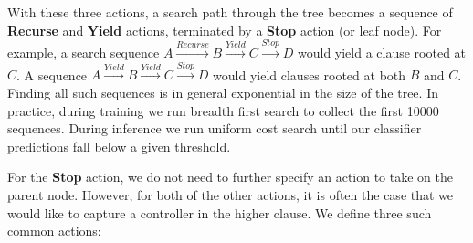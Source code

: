 
With these three actions, a search path through the tree becomes a sequence
  of \textbf{Recurse} and \textbf{Yield} actions, terminated by a \textbf{Stop}
  action (or leaf node).
For example, a search sequence 
  $A \xrightarrow{Recurse} B \xrightarrow{Yield} C \xrightarrow{Stop} D$
  would yield a clause rooted at $C$.
A sequence 
  $A \xrightarrow{Yield} B \xrightarrow{Yield} C \xrightarrow{Stop} D$
  would yield clauses rooted at both $B$ and $C$.
Finding all such sequences is in general exponential in the size of the tree.
In practice, during training we run breadth first search to collect the
  first \num{10000} sequences.
During inference we run uniform cost search until our classifier predictions
  fall below a given threshold.

For the \textbf{Stop} action, we do not need to further specify an action
  to take on the parent node.
However, for both of the other actions, it is often the case that we would like
  to capture a controller in the higher clause.
We define three such common actions:

